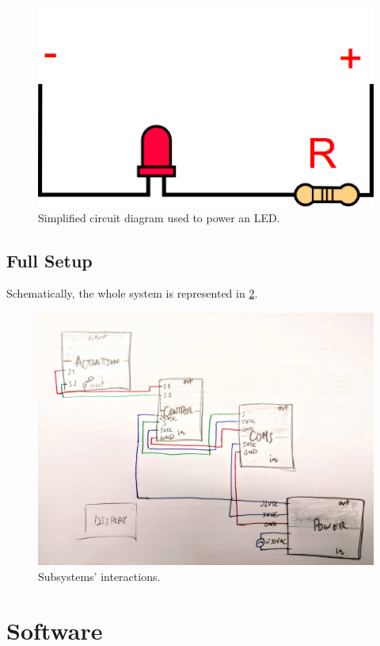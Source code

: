 \documentclass[twoside,a4paper]{refart}
\begin{document}
\begin{figure}
	\centering
	\includegraphics[width=0.4\linewidth]{led_circuit}
	\caption{Simplified circuit diagram used to power an LED.}
	\label{fig:led_circuit}
\end{figure}


\subsection{Full Setup}
Schematically, the whole system is represented in \cref{fig:subsystem_full}.
\begin{figure}[H]
	\centering
	\includegraphics[width=1.0\linewidth]{subsystems_0}
	\caption{Subsystems' interactions.}
	\label{fig:subsystem_full}
\end{figure}



\section{Software}
\end{document}
